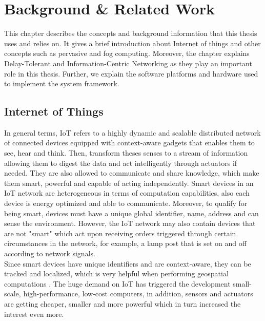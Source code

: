 
\chapter{Background \& Related Work}\label{chapter:background}

This chapter describes the concepts and background information that this thesis uses and relies on. It gives a brief introduction about Internet of things and other concepts such as pervasive and fog computing. Moreover, the chapter explains Delay-Tolerant and Information-Centric Networking as they play an important role in this thesis. Further, we explain the software platforms and hardware used to implement the system framework.

\section{Internet of Things}

In general terms, IoT refers to a highly dynamic and scalable distributed network of connected devices equipped with context-aware gadgets that enables them to see, hear and think\cite{DAC:DAC2417}. Then, transform theses senses to a stream of information allowing them to digest the data and act intelligently through actuators if needed. They are also allowed to communicate and share knowledge, which make them smart, powerful and capable of acting independently. Smart devices in an IoT network are heterogeneous in terms of computation capabilities, also each device is energy optimized and able to communicate. Moreover, to qualify for being smart, devices must have a unique global identifier, name, address and can sense the environment. However, the IoT network may also contain devices that are not "smart" which act upon receiving orders triggered through certain circumstances in the network, for example, a lamp post that is set on and off according to network signals. \\

\noindent Since smart devices have unique identifiers and are context-aware, they can be tracked and localized, which is very helpful when performing geospatial computations \cite{Miorandi20121497}. The huge demand on IoT has triggered the development small-scale, high-performance, low-cost computers, in addition, sensors and actuators are getting cheaper, smaller and more powerful which in turn increased the interest even more.\\
 

